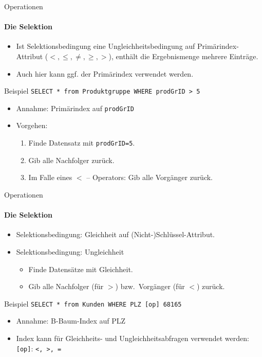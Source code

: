\begin{frame}[fragile]{Operationen}
\framesubtitle{Die Selektion}
\begin{itemize}
	\item Ist Selektionsbedingung eine Ungleichheitsbedingung auf Prim\"arindex-Attribut ($<, \leq, \neq, \geq, >$), 
	enthält die Ergebnismenge mehrere Einträge.
	\item Auch hier kann ggf. der Prim\"arindex verwendet werden.
\end{itemize}
\abs
\begin{block}{Beispiel}
\texttt{SELECT * from Produktgruppe WHERE prodGrID > 5}
\begin{itemize}
\item Annahme: Prim\"arindex auf \texttt{prodGrID}
\item Vorgehen: 
\begin{enumerate}
\item Finde Datensatz mit \texttt{prodGrID=5}.
\item Gib alle Nachfolger zurück.
\item Im Falle eines $<$ -- Operators: Gib alle Vorgänger zurück.
\end{enumerate}
\end{itemize}
\end{block}
\end{frame}

\begin{frame}[fragile]{Operationen}
\framesubtitle{Die Selektion}
\begin{itemize}
\item Selektionsbedingung: Gleichheit auf (Nicht-)Schlüssel-Attribut. 
\item Selektionsbedingung: Ungleichheit
\begin{itemize}
\item Finde Datens\"atze mit Gleichheit.
\item Gib alle Nachfolger (f\"ur $>$) bzw.~Vorg\"anger (f\"ur $<$) zurück.
\end{itemize}
\end{itemize}
\abs
\begin{block}{Beispiel}
\texttt{SELECT * from Kunden WHERE PLZ [op] 68165}
\begin{itemize}
\item Annahme: B-Baum-Index auf PLZ
\item Index kann f\"ur Gleichheits- und Ungleichheitsabfragen verwendet werden: \texttt{[op]}: \texttt{<, >, =}
\end{itemize}
\end{block}
\end{frame}

